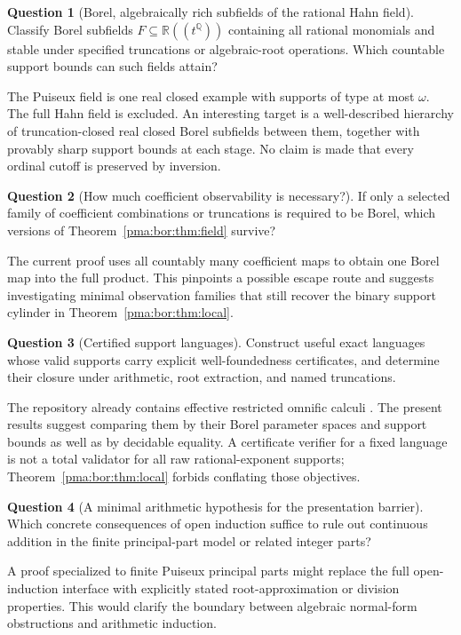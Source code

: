 \documentclass[11pt]{article}
\numberwithin{equation}{section}
\theoremstyle{definition}
\newtheorem{question}[question]{Question}
\theoremstyle{remark}
\newcommand{\Q}{\mathbb Q}
\newcommand{\R}{\mathbb R}
\begin{document}
\begin{question}[Borel, algebraically rich subfields of the rational Hahn field]
Classify Borel subfields $F\subseteq\R((t^\Q))$ containing all rational
monomials and stable under specified truncations or algebraic-root operations.
Which countable support bounds can such fields attain?
\end{question}
The Puiseux field is one real closed example with supports of type at most
$\omega$. The full Hahn field is excluded. An interesting target is a
well-described hierarchy of truncation-closed real closed Borel subfields
between them, together with provably sharp support bounds at each stage.
No claim is made that every ordinal cutoff is preserved by inversion.

\begin{question}[How much coefficient observability is necessary?]
If only a selected family of coefficient combinations or truncations is
required to be Borel, which versions of Theorem~\ref{pma:bor:thm:field} survive?
\end{question}
The current proof uses all countably many coefficient maps to obtain one
Borel map into the full product. This pinpoints a possible escape route and
suggests investigating minimal observation families that still recover the
binary support cylinder in Theorem~\ref{pma:bor:thm:local}.

\begin{question}[Certified support languages]
Construct useful exact languages whose valid supports carry explicit
well-foundedness certificates, and determine their closure under arithmetic,
root extraction, and named truncations.
\end{question}
The repository already contains effective restricted omnific calculi
\cite{RepoNotations}. The present results suggest comparing them by their
Borel parameter spaces and support bounds as well as by decidable equality.
A certificate verifier for a fixed language is not a total validator for all
raw rational-exponent supports; Theorem~\ref{pma:bor:thm:local} forbids conflating
those objectives.

\begin{question}[A minimal arithmetic hypothesis for the presentation barrier]
Which concrete consequences of open induction suffice to rule out continuous
addition in the finite principal-part model or related integer parts?
\end{question}
A proof specialized to finite Puiseux principal parts might replace the full
open-induction interface with explicitly stated root-approximation or
division properties. This would clarify the boundary between algebraic
normal-form obstructions and arithmetic induction.
\end{document}

